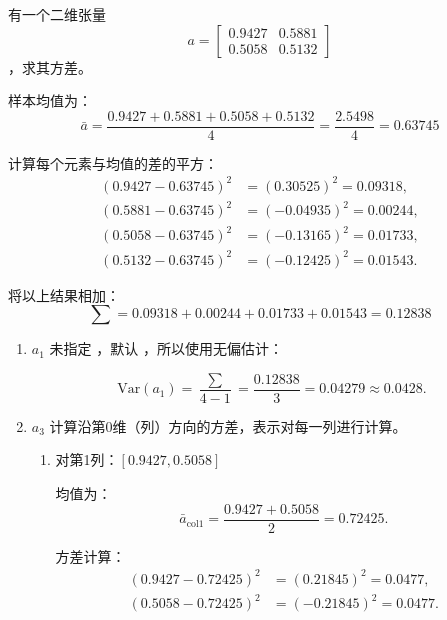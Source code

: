 \begin{example}
        \exProblem
        有一个二维张量
        $$a=\begin{bmatrix}0.9427&0.5881\\0.5058&0.5132\end{bmatrix}$$，求其方差。
        \exSolution

        样本均值为：
        $$\bar{a}=\frac{0.9427+0.5881+0.5058+0.5132}{4}=\frac{2.5498}{4}=0.63745$$

        计算每个元素与均值的差的平方：
        $$\begin{aligned}
                (0.9427-0.63745)^2 &=(0.30525)^2=0.09318, \\
                (0.5881-0.63745)^2 &=(-0.04935)^2=0.00244, \\
                (0.5058-0.63745)^2 &=(-0.13165)^2=0.01733, \\
                (0.5132-0.63745)^2 &=(-0.12425)^2=0.01543. 
        \end{aligned}$$

        将以上结果相加：
        $$\sum=0.09318+0.00244+0.01733+0.01543=0.12838$$

        \begin{enumerate}[label=\arabic*)]
                \item $a_1$
                未指定 ，默认 ，所以使用无偏估计：

                $$\mathrm{Var}(a_1)=\frac{\sum}{4-1}=\frac{0.12838}3=0.04279\approx0.0428.$$
                \item $a_3$
                计算沿第0维（列）方向的方差，表示对每一列进行计算。

                \begin{enumerate}[itemindent=1em,label=\arabic*)]
                        \item 对第1列：$[0.9427,0.5058]$

                        均值为：
                        $$\bar{a}_{{\mathrm{col}1}}=\frac{0.9427+0.5058}{2}=0.72425.$$
        
                        方差计算：
                        $$\begin{aligned}
                                (0.9427-0.72425)^{2}&=(0.21845)^{2}=0.0477,\\
                                (0.5058-0.72425)^{2}&=(-0.21845)^{2}=0.0477.
                        \end{aligned}$$
        

\end{enumerate}
\end{enumerate}
\end{example}
